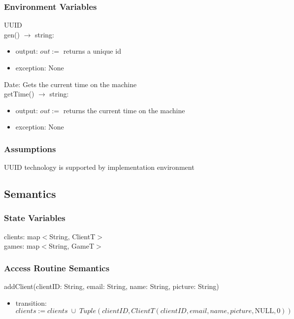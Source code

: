 \documentclass[12pt, titlepage]{article}
\begin{document}
\subsubsection{Environment Variables}

UUID\\
gen() $\rightarrow$ string:
\begin{itemize}
    \item output: $out := $ returns a unique id
    \item exception:    None
\end{itemize}

Date: Gets the current time on the machine\\
getTime() $\rightarrow$ string:
\begin{itemize}
    \item output: $out := $ returns the current time on the machine
    \item exception:    None
\end{itemize}

\subsubsection{Assumptions}

UUID technology is supported by implementation environment


\subsection{Semantics}

\subsubsection{State Variables}

clients: map$<$String, ClientT$>$ \\
games: map$<$String, GameT$>$


\subsubsection{Access Routine Semantics}

\noindent addClient(clientID: String, email: String, name: String, picture: String)
\begin{itemize}
\item transition:$clients := clients \;\cup\;  Tuple(clientID, ClientT(clientID, email, name, picture, \text{NULL}, 0))$ \\
\end{itemize}
\end{document}
